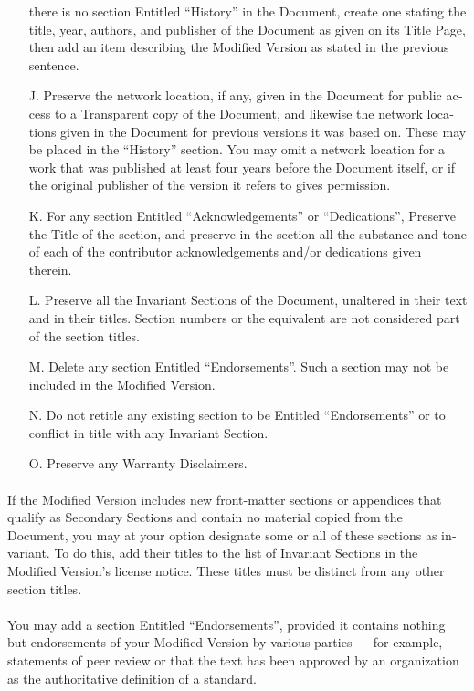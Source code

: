 \documentclass[11pt,a5paper,twoside]{book}
\begin{document}
\begin{english}
\begin{itemize}
   there is no section Entitled “History” in the Document, create one
   stating the title, year, authors, and publisher of the Document as
   given on its Title Page, then add an item describing the Modified
   Version as stated in the previous sentence.
\item[J.]
   Preserve the network location, if any, given in the Document for
   public access to a Transparent copy of the Document, and likewise
   the network locations given in the Document for previous versions
   it was based on.  These may be placed in the “History” section.
   You may omit a network location for a work that was published at
   least four years before the Document itself, or if the original
   publisher of the version it refers to gives permission.
\item[K.]
   For any section Entitled “Acknowledgements” or “Dedications”,
   Preserve the Title of the section, and preserve in the section all
   the substance and tone of each of the contributor acknowledgements
   and/or dedications given therein.
\item[L.]
   Preserve all the Invariant Sections of the Document,
   unaltered in their text and in their titles.  Section numbers
   or the equivalent are not considered part of the section titles.
\item[M.]
   Delete any section Entitled “Endorsements”.  Such a section
   may not be included in the Modified Version.
\item[N.]
   Do not retitle any existing section to be Entitled “Endorsements”
   or to conflict in title with any Invariant Section.
\item[O.]
   Preserve any Warranty Disclaimers.
\end{itemize}
\paragraph{}If the Modified Version includes new front-matter sections or
appendices that qualify as Secondary Sections and contain no material
copied from the Document, you may at your option designate some or all
of these sections as invariant.  To do this, add their titles to the
list of Invariant Sections in the Modified Version’s license notice.
These titles must be distinct from any other section titles.
\paragraph{}You may add a section Entitled “Endorsements”, provided it contains
nothing but endorsements of your Modified Version by various
parties — for example, statements of peer review or that the text has
been approved by an organization as the authoritative definition of a
standard.

\end{english}
\end{document}
